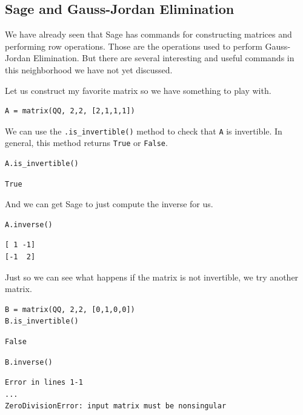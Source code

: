 \documentclass[10pt,]{book}
\theoremstyle{plain}
\theoremstyle{definition}
\numberwithin{equation}{section}
\begin{document}
\subsection[Sage and Gauss-Jordan Elimination]{Sage and Gauss-Jordan Elimination}\label{subsection-44}

      We have already seen that Sage has commands for constructing matrices and
      performing row operations. Those are the operations used to perform
      Gauss-Jordan Elimination. But there are several interesting and useful
      commands in this neighborhood we have not yet discussed.
\par

      Let us construct my favorite matrix so we have something to play with.
\begin{lstlisting}[style=sageinput]
A = matrix(QQ, 2,2, [2,1,1,1])
\end{lstlisting}
\par

      We can use the \verb?.is_invertible()? method to check that \verb?A? is
      invertible. In general, this method returns \verb?True? or \verb?False?.
\begin{lstlisting}[style=sageinput]
A.is_invertible()
\end{lstlisting}
\begin{lstlisting}[style=sageoutput]
True
\end{lstlisting}
\par

      And we can get Sage to just compute the inverse for us.
\begin{lstlisting}[style=sageinput]
A.inverse()
\end{lstlisting}
\begin{lstlisting}[style=sageoutput]
[ 1 -1]
[-1  2]
\end{lstlisting}
\par

      Just so we can see what happens if the matrix is not invertible, we try
      another matrix.
\begin{lstlisting}[style=sageinput]
B = matrix(QQ, 2,2, [0,1,0,0])
B.is_invertible()
\end{lstlisting}
\begin{lstlisting}[style=sageoutput]
False
\end{lstlisting}
\begin{lstlisting}[style=sageinput]
B.inverse()
\end{lstlisting}
\begin{lstlisting}[style=sageoutput]
Error in lines 1-1
...
ZeroDivisionError: input matrix must be nonsingular
\end{lstlisting}
\par
\end{document}
